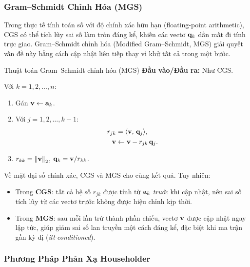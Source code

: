 \subsubsection{Gram--Schmidt Chỉnh Hóa (MGS)}

Trong thực tế tính toán số với độ chính xác hữu hạn (floating-point arithmetic), CGS
có thể tích lũy sai số làm tròn đáng kể, khiến các vectơ $\mathbf{q}_k$ dần mất đi
tính trực giao. Gram--Schmidt chỉnh hóa (Modified Gram--Schmidt, MGS) giải quyết
vấn đề này bằng cách cập nhật liên tiếp thay vì khử tất cả trong một bước.

\begin{mydef}{Thuật toán Gram--Schmidt chỉnh hóa (MGS)}{}
\textbf{Đầu vào/Đầu ra:} Như CGS.

Với $k = 1, 2, \ldots, n$:
\begin{enumerate}[label=\arabic*.]
    \item Gán $\mathbf{v} \leftarrow \mathbf{a}_k$.
    \item Với $j = 1, 2, \ldots, k-1$:
    \begin{align}
        r_{jk} &= \langle \mathbf{v},\, \mathbf{q}_j \rangle, \label{eq:mgs_rjk} \\
        \mathbf{v} &\leftarrow \mathbf{v} - r_{jk}\, \mathbf{q}_j. \label{eq:mgs_update}
    \end{align}
    \item $r_{kk} = \left\lVert\mathbf{v}\right\rVert_2$, \quad $\mathbf{q}_k = \mathbf{v} / r_{kk}$.
\end{enumerate}
\end{mydef}


Về mặt đại số chính xác, CGS và MGS cho cùng kết quả. Tuy nhiên:
\begin{itemize}
    \item Trong \textbf{CGS}: tất cả hệ số $r_{jk}$ được tính từ $\mathbf{a}_k$
          \textit{trước} khi cập nhật, nên sai số tích lũy từ các vectơ trước
          không được hiệu chỉnh kịp thời.
    \item Trong \textbf{MGS}: sau mỗi lần trừ thành phần chiếu, vectơ $\mathbf{v}$
          được cập nhật ngay lập tức, giúp giảm sai số lan truyền một cách đáng
          kể, đặc biệt khi ma trận gần kỳ dị (\textit{ill-conditioned}).
\end{itemize}

\subsubsection{Phương Pháp Phản Xạ Householder}
\label{sec:householder}

